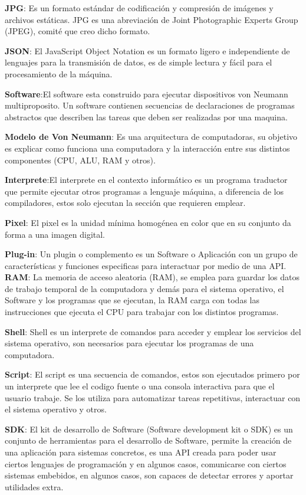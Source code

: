 \textbf{JPG}: Es un formato estándar de codificación y compresión de imágenes y archivos estáticas. JPG es una abreviación de Joint Photographic Experts Group (JPEG), comité que creo dicho formato.

\textbf{JSON}: El JavaScript Object Notation es un formato ligero e independiente de lenguajes para la transmisión de datos, es de simple lectura y fácil para el procesamiento de la máquina.

\textbf{Software}:El software esta construido para ejecutar dispositivos von Neumann multiproposito. Un software contienen secuencias de declaraciones de programas abstractos que describen las tareas que deben ser realizadas por una maquina. 

\textbf{Modelo de Von Neumann}: Es una arquitectura de computadoras, su objetivo es explicar como funciona una computadora y la interacción entre sus distintos componentes (CPU, ALU, RAM y otros).

\textbf{Interprete}:El interprete en el contexto informático es un programa traductor que permite ejecutar otros programas a lenguaje máquina, a diferencia de los compiladores, estos solo ejecutan la sección que requieren emplear.

\textbf{Pixel}: El pixel es la unidad mínima homogénea en color que en su conjunto da forma a una imagen digital.

\textbf{Plug-in}: Un plugin o complemento es un Software o Aplicación con un grupo de características y funciones especificas para interactuar por medio de una API.
\textbf{RAM}: La memoria de acceso aleatoria (RAM), se emplea para guardar los datos de trabajo temporal de la computadora y demás para el sistema operativo, el Software y los programas que se ejecutan, la RAM carga con todas las instrucciones que ejecuta el CPU para trabajar con los distintos programas.

\textbf{Shell}: Shell es un interprete de comandos para acceder y emplear los servicios del sistema operativo, son necesarios para ejecutar los programas de una computadora.

\textbf{Script}: El script es una secuencia de comandos, estos son ejecutados primero por un interprete que lee el codigo fuente o una consola interactiva para que el usuario trabaje. Se los utiliza para automatizar tareas repetitivas, interactuar con el sistema operativo y otros.

\textbf{SDK}: El kit de desarrollo de Software (Software development kit o SDK) es un conjunto de herramientas para el desarrollo de Software, permite la creación de una aplicación para sistemas concretos, es una API creada para poder usar ciertos lenguajes de programación y en algunos casos, comunicarse con ciertos sistemas embebidos, en algunos casos, son capaces de detectar errores y aportar utilidades extra.

